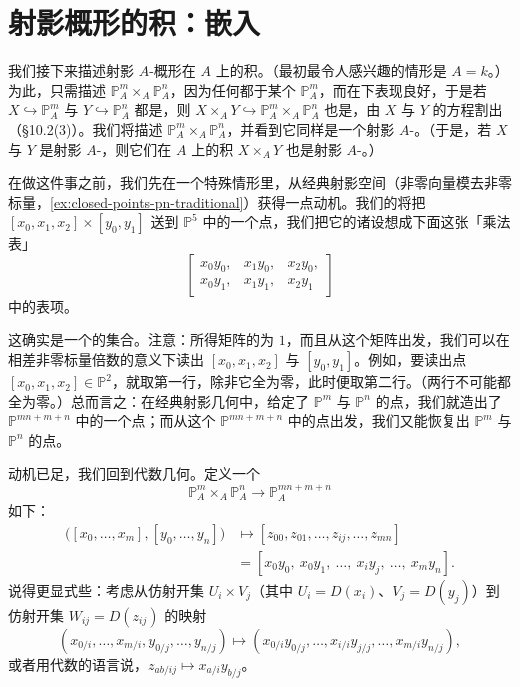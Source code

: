 
\section{射影概形的积：\trSegre{}嵌入}

我们接下来描述射影 $A$-概形在 $A$ 上的积。（最初最令人感兴趣的情形是 $A=k$。）为此，只需描述 $\mathbb{P}^m_A\times_A\mathbb{P}^n_A$，因为任何\trProjectiveScheme{}都\trClosedEmbedding{}于某个 $\mathbb{P}^m_A$，而\trClosedEmbedding{}在\trBaseChange{}下表现良好，于是若 $X\hookrightarrow\mathbb{P}^m_A$ 与 $Y\hookrightarrow\mathbb{P}^n_A$ 都是\trClosedEmbedding，则 $X\times_A Y\hookrightarrow\mathbb{P}^m_A\times_A\mathbb{P}^n_A$ 也是\trClosedEmbedding，由 $X$ 与 $Y$ 的方程割出（\S10.2(3)）。我们将描述 $\mathbb{P}^m_A\times_A\mathbb{P}^n_A$，并看到它同样是一个射影 $A$-\trScheme。（于是，若 $X$ 与 $Y$ 是射影 $A$-\trScheme，则它们在 $A$ 上的积 $X\times_A Y$ 也是射影 $A$-\trScheme。）

在做这件事之前，我们先在一个特殊情形里，从经典射影空间（非零向量模去非零标量，\cref{ex:closed-points-pn-traditional}）获得一点动机。我们的\trMap{}将把 $[x_0,x_1,x_2]\times[y_0,y_1]$ 送到 $\mathbb{P}^5$ 中的一个点，我们把它的诸\trCoordinate{}设想成下面这张「乘法表」
\[
\left[\begin{array}{ccc}
x_0y_0, & x_1y_0, & x_2y_0, \\
x_0y_1, & x_1y_1, & x_2y_1
\end{array}\right]
\]
中的表项。

这确实是一个\trWellDefined{}的集合\trMap。注意：所得矩阵的\trRank{}为 $1$，而且从这个矩阵出发，我们可以在相差非零标量倍数的意义下读出 $[x_0,x_1,x_2]$ 与 $[y_0,y_1]$。例如，要读出点 $[x_0,x_1,x_2]\in\mathbb{P}^2$，就取第一行，除非它全为零，此时便取第二行。（两行不可能都全为零。）总而言之：在经典射影几何中，给定了 $\mathbb{P}^m$ 与 $\mathbb{P}^n$ 的点，我们就造出了 $\mathbb{P}^{mn+m+n}$ 中的一个点；而从这个 $\mathbb{P}^{mn+m+n}$ 中的点出发，我们又能恢复出 $\mathbb{P}^m$ 与 $\mathbb{P}^n$ 的点。

动机已足，我们回到代数几何。定义一个\trMap
\[
\mathbb{P}^m_A\times_A\mathbb{P}^n_A\longrightarrow\mathbb{P}^{mn+m+n}_A
\]
如下：
\[
\begin{aligned}
\bigl([x_0,\dots,x_m],[y_0,\dots,y_n]\bigr)&\longmapsto[z_{00},z_{01},\dots,z_{ij},\dots,z_{mn}]\\
&=[x_0y_0,\ x_0y_1,\ \dots,\ x_iy_j,\ \dots,\ x_my_n].
\end{aligned}
\]
说得更显式些：考虑从仿射开集 $U_i\times V_j$（其中 $U_i=D(x_i)$、$V_j=D(y_j)$）到仿射开集 $W_{ij}=D(z_{ij})$ 的映射
\[
(x_{0/i},\dots,x_{m/i},y_{0/j},\dots,y_{n/j})\longmapsto(x_{0/i}y_{0/j},\dots,x_{i/i}y_{j/j},\dots,x_{m/i}y_{n/j}),
\]
或者用代数的语言说，$z_{ab/ij}\mapsto x_{a/i}y_{b/j}$。

